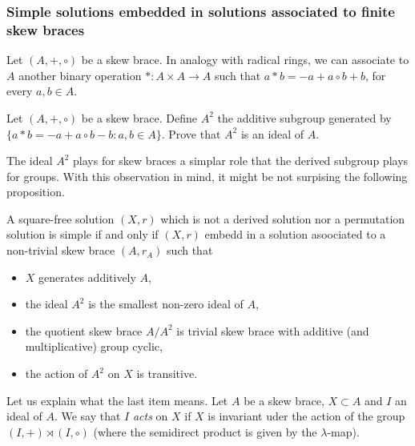 \subsubsection{Simple solutions embedded in solutions associated to finite skew braces}

Let $(A,+,\circ)$ be a skew brace. In analogy with radical rings, we can associate to $A$ another binary operation $\ast:A\times A\to A$ such that $a\ast b = -a+a\circ b +b$, for every $a,b\in A$.

\begin{exercise}\label{ex:A2}
    Let $(A,+,\circ)$ be a skew brace. Define $A^2$ the additive subgroup generated by $\{a\ast b=-a+a\circ b - b \colon a,b\in A\}$. Prove that 
    $A^2$ is an ideal of $A$.
\end{exercise}

The ideal $A^2$ plays for skew braces a simplar role that the derived subgroup plays for groups. With this observation in mind, it might be not surpising the following proposition. 

\begin{proposition}
    A square-free solution $(X,r)$ which is not a derived solution nor a permutation solution is simple if and only if $(X,r)$ embedd in a solution asoociated to a non-trivial skew brace $(A,r_A)$ such that
    \begin{itemize}
        \item $X$ generates additively $A$,
        \item the ideal $A^2$ is the smallest non-zero ideal of $A$,
        \item the quotient skew brace $A/A^2$ is trivial skew brace with additive (and multiplicative) group cyclic,
        \item the action of $A^2$ on $X$ is transitive.
    \end{itemize}
\end{proposition}

Let us explain what the last item means. Let $A$ be a skew brace, $X\subset A$ and $I$ an ideal of $A$. We say that $I$ \emph{acts} on $X$ if $X$ is invariant uder the action of the group $(I,+)\rtimes (I,\circ)$ (where the semidirect product is given by the $\lambda$-map).
